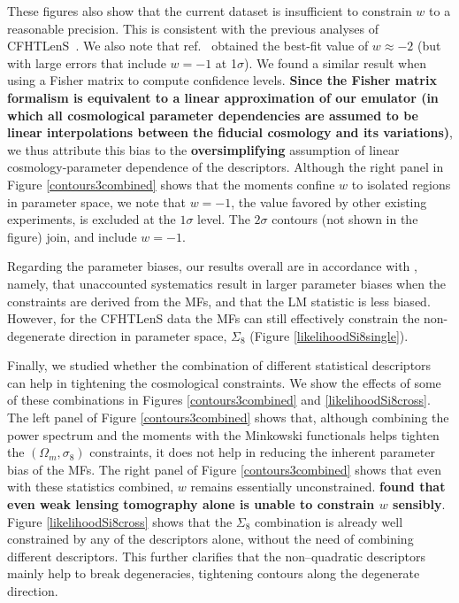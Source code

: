\documentclass[reprint,aps,prd,superscriptaddress,showkeys,showpacs]{revtex4-1}
\begin{document}
These figures also show that the current dataset is insufficient to
constrain $w$ to a reasonable precision.
This is consistent with the previous analyses of
CFHTLenS~\citep{CFHTKilbinger,CFHTFu,Companion,CFHTMasato}.  We also
note that ref.~\citep{CFHTMasato} obtained the best-fit value of
$w\approx -2$ (but with large errors that include $w=-1$ at
1$\sigma$).  We found a similar result when using a Fisher matrix to
compute confidence levels. \textbf{Since the Fisher matrix formalism is equivalent to a linear approximation of our emulator (in which all cosmological parameter dependencies are assumed to be linear interpolations between the fiducial cosmology and its variations)}, we thus attribute this bias to the \textbf{oversimplifying} assumption of linear cosmology-parameter dependence of the descriptors.  
Although the right panel in Figure
\ref{contours3combined} shows that the moments confine $w$ to isolated
regions in parameter space, we note that $w=-1$, the value favored by other existing experiments, is excluded at the $1\sigma$
level. The $2\sigma$ contours (not shown in the figure) join, and
include $w=-1$.


Regarding the parameter biases, our results overall are in accordance
with \citep{PetriSpurious}, namely, that unaccounted systematics
result in larger parameter biases when the constraints are derived
from the MFs, and that the LM statistic is less biased. However, for
the CFHTLenS data the MFs can still effectively constrain the
non-degenerate direction in parameter space, $\Sigma_8$ (Figure
\ref{likelihoodSi8single}).



Finally, we studied whether the combination of different statistical
descriptors can help in tightening the cosmological constraints. We
show the effects of some of these combinations in Figures
\ref{contours3combined} and \ref{likelihoodSi8cross}. The left panel
of Figure \ref{contours3combined} shows that, although combining the
power spectrum and the moments with the Minkowski functionals helps
tighten the $(\Omega_m,\sigma_8)$ constraints, it does not help in
reducing the inherent parameter bias of the MFs. The right panel of Figure
\ref{contours3combined} shows that even with these statistics
combined, $w$ remains essentially unconstrained. \textbf{\citep{CFHTHeymansTomo} found that even weak lensing tomography alone is unable to constrain $w$ sensibly}. 
Figure \ref{likelihoodSi8cross} shows that the $\Sigma_8$ combination is
already well constrained by any of the descriptors alone, without the
need of combining different descriptors.
This further clarifies that the non--quadratic descriptors mainly help
to break degeneracies, tightening contours along the
degenerate direction.
\end{document}
